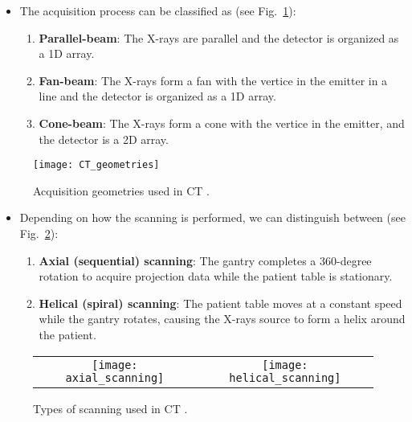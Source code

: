 \begin{itemize}
\item The acquisition process can be classified as
(see Fig.~\ref{fig:CT_geometries}):
\begin{enumerate}
\item \textbf{Parallel-beam}: The X-rays are parallel and the detector
  is organized as a 1D array.
\item \textbf{Fan-beam}: The X-rays form a fan with the vertice in the
  emitter in a line and the detector is organized as a 1D array.
\item \textbf{Cone-beam}: The X-rays form a cone with the
  vertice in the emitter, and the detector is a 2D array.
\end{enumerate}
\end{itemize}
\vspace{-1ex}
\begin{figure}[H]
  \centering
  \texttt{[image: CT\_geometries]}
  \caption{Acquisition geometries used in CT \cite{takase2025CT}.\label{fig:CT_geometries}}
\end{figure}

\begin{itemize}
\item Depending on how the scanning is performed, we can distinguish between
(see Fig.~\ref{fig:scannings}):
\begin{enumerate}
\item \textbf{Axial (sequential) scanning}:
  The gantry completes a 360-degree rotation to acquire projection
  data while the patient table is stationary. 
\item \textbf{Helical (spiral) scanning}: The patient table moves
  at a constant speed while the gantry rotates, causing the X-rays
  source to form a helix around the patient.
\end{enumerate}
\end{itemize}
\begin{figure}[H]
  \centering
  \begin{tabular}{cc}
    \texttt{[image: axial\_scanning]} & \texttt{[image: helical\_scanning]}
  \end{tabular}
  \caption{Types of scanning used in CT \cite{abdulla2025acquiring1}.\label{fig:scannings}}
\end{figure}

